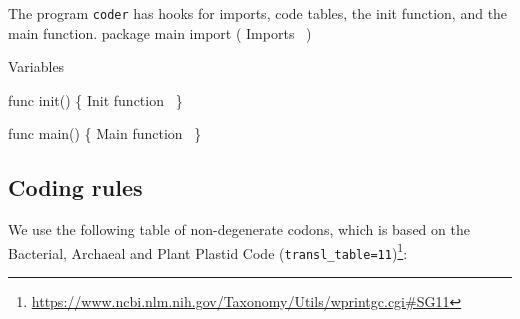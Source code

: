 \nwfilename{}\nwenddocs{}\nwdocspar%
The program \texttt{coder} has hooks for imports, code tables, the
init function, and the main function.
\nwenddocs{}\endmoddef\nwstartdeflinemarkup\nwenddeflinemarkup
package main
import (
          \LA{}Imports~{\nwtagstyle{}}\RA{}
)

\LA{}Variables~{\nwtagstyle{}}\RA{}

func init() \{
          \LA{}Init function~{\nwtagstyle{}}\RA{}
\}

func main() \{
          \LA{}Main function~{\nwtagstyle{}}\RA{}
\}
\nwendcode{}\nwdocspar
\subsection{Coding rules}
We use the following table of non-degenerate codons, which is based on
the Bacterial, Archaeal and Plant Plastid Code
(\texttt{transl\_table=11})\footnote{\url{https://www.ncbi.nlm.nih.gov/Taxonomy/Utils/wprintgc.cgi#SG11}}:

